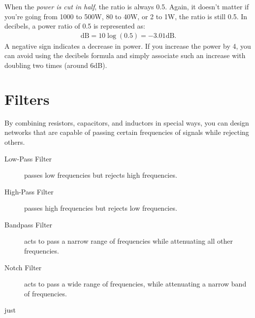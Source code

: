 \documentclass[../../document]{subfiles}
\begin{document}
When the \emph{power is cut in half}, the ratio is always 0.5. Again, it
doesn’t matter if you’re going from 1000 to 500\unit{\watt}, 80 to
40\unit{\watt}, or 2 to 1\unit{\watt}, the ratio is still 0.5. In decibels, a
power ratio of 0.5 is represented as:
\begin{gather}
	\unit{\deci\bel} = 10\log\left(0.5\right) = -3.01\unit{\deci\bel}.
\end{gather}
A negative sign indicates a decrease in power. If you increase the power by 4,
you can avoid using the decibels formula and simply associate such an increase
with doubling two times (around 6\unit{\deci\bel}).
\cite{practical_electronics}

\section{Filters}
By combining resistors, capacitors, and inductors in special ways, you can
design networks that are capable of passing certain frequencies of signals
while rejecting others. \cite[sec. 2.23]{practical_electronics}
\begin{description}
	\item[Low-Pass Filter] passes low frequencies but rejects high frequencies.
	\item[High-Pass Filter] passes high frequencies but rejects low frequencies.
	\item[Bandpass Filter] acts to pass a narrow range of frequencies while
		attenuating all other frequencies.
	\item[Notch Filter] acts to pass a wide range of frequencies, while
		attenuating a narrow band of frequencies.
\end{description}
just
\end{document}
